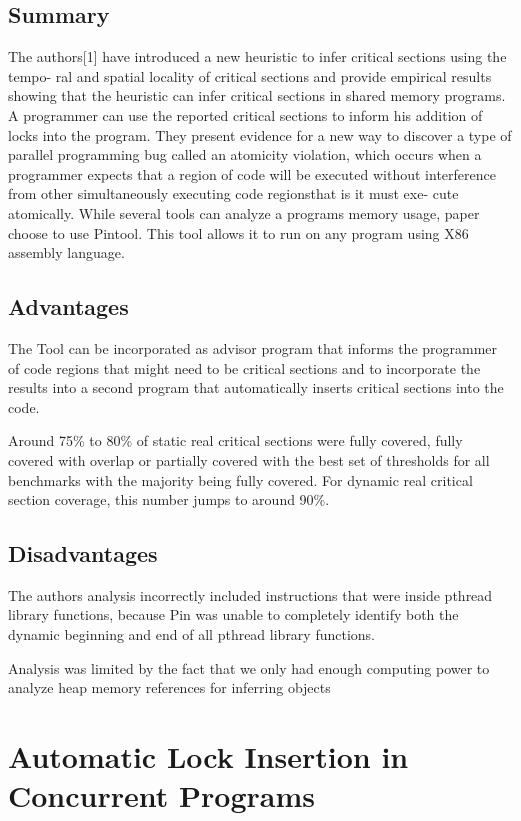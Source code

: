 \subsection{Summary}

The authors[1] have introduced a new heuristic to infer critical sections using the tempo- ral and spatial locality of critical sections and provide empirical results showing that the heuristic can infer critical sections in shared memory programs. A programmer can use the reported critical sections to inform his addition of locks into the program. They present evidence for a new way to discover a type of parallel programming bug called an atomicity violation, which occurs when a programmer expects that a region of code will be executed without interference from other simultaneously executing code regionsthat is it must exe- cute atomically. While several tools can analyze a programs memory usage, paper choose to use Pintool. This tool allows it to run on any program using X86 assembly language.

\subsection{Advantages}

The Tool can be incorporated as advisor program that informs the programmer of code regions that might need to be critical sections and to incorporate the results into a second program that automatically inserts critical sections into the code.

Around 75\% to 80\% of static real critical sections were fully covered, fully covered with overlap or partially covered with the best set of thresholds for all benchmarks with the majority being fully covered. For dynamic real critical section coverage, this number jumps to around 90\%.

\subsection{Disadvantages}

The authors analysis incorrectly included instructions that were inside pthread library functions, because Pin was unable to completely identify both the dynamic beginning and end of all pthread library functions.

Analysis was limited by the fact that we only had enough computing power to analyze heap memory references for inferring objects


\section{Automatic Lock Insertion in Concurrent Programs}


